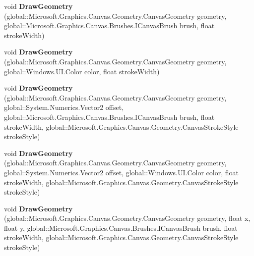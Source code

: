 \begin{DoxyCompactItemize}
void {\bfseries Draw\+Geometry} (global\+::\+Microsoft.\+Graphics.\+Canvas.\+Geometry.\+Canvas\+Geometry geometry, global\+::\+Microsoft.\+Graphics.\+Canvas.\+Brushes.\+I\+Canvas\+Brush brush, float stroke\+Width)
\item 
\mbox{\label{class_microsoft_1_1_graphics_1_1_canvas_1_1_canvas_drawing_session_a5c4ce0d7be91e58ff8dc914880e231e8}} 
void {\bfseries Draw\+Geometry} (global\+::\+Microsoft.\+Graphics.\+Canvas.\+Geometry.\+Canvas\+Geometry geometry, global\+::\+Windows.\+U\+I.\+Color color, float stroke\+Width)
\item 
\mbox{\label{class_microsoft_1_1_graphics_1_1_canvas_1_1_canvas_drawing_session_afd10ed3cd35716eec33d455787db693d}} 
void {\bfseries Draw\+Geometry} (global\+::\+Microsoft.\+Graphics.\+Canvas.\+Geometry.\+Canvas\+Geometry geometry, global\+::\+System.\+Numerics.\+Vector2 offset, global\+::\+Microsoft.\+Graphics.\+Canvas.\+Brushes.\+I\+Canvas\+Brush brush, float stroke\+Width, global\+::\+Microsoft.\+Graphics.\+Canvas.\+Geometry.\+Canvas\+Stroke\+Style stroke\+Style)
\item 
\mbox{\label{class_microsoft_1_1_graphics_1_1_canvas_1_1_canvas_drawing_session_add34c4d4870fd43ac514469057c52add}} 
void {\bfseries Draw\+Geometry} (global\+::\+Microsoft.\+Graphics.\+Canvas.\+Geometry.\+Canvas\+Geometry geometry, global\+::\+System.\+Numerics.\+Vector2 offset, global\+::\+Windows.\+U\+I.\+Color color, float stroke\+Width, global\+::\+Microsoft.\+Graphics.\+Canvas.\+Geometry.\+Canvas\+Stroke\+Style stroke\+Style)
\item 
\mbox{\label{class_microsoft_1_1_graphics_1_1_canvas_1_1_canvas_drawing_session_ab2e3b65d15b4f9a85d8164160f2618bd}} 
void {\bfseries Draw\+Geometry} (global\+::\+Microsoft.\+Graphics.\+Canvas.\+Geometry.\+Canvas\+Geometry geometry, float x, float y, global\+::\+Microsoft.\+Graphics.\+Canvas.\+Brushes.\+I\+Canvas\+Brush brush, float stroke\+Width, global\+::\+Microsoft.\+Graphics.\+Canvas.\+Geometry.\+Canvas\+Stroke\+Style stroke\+Style)
\item 
\mbox{\label{class_microsoft_1_1_graphics_1_1_canvas_1_1_canvas_drawing_session_afea11ead17f8826cbec4ad1cbaec2f3a}} 

\end{DoxyCompactItemize}
